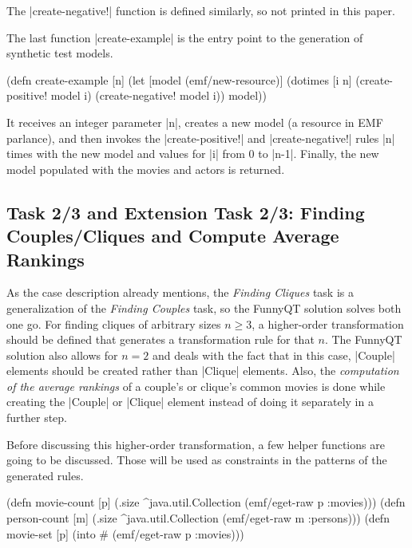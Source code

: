 \documentclass[submission]{eptcs}
\newcommand{\code}{\clojureinline}
\begin{document}
The \code|create-negative!| function is defined similarly, so not printed in
this paper.

The last function \code|create-example| is the entry point to the generation of
synthetic test models.

\begin{clojurecode}
(defn create-example [n]
  (let [model (emf/new-resource)]
    (dotimes [i n]
      (create-positive! model i)
      (create-negative! model i))
    model))
\end{clojurecode}

It receives an integer parameter \code|n|, creates a new model (a resource in
EMF parlance), and then invokes the \code|create-positive!| and
\code|create-negative!| rules \code|n| times with the new model and values for
\code|i| from 0 to \code|n-1|.  Finally, the new model populated with the
movies and actors is returned.


\subsection{Task 2/3 and Extension Task 2/3: Finding Couples/Cliques and
  Compute Average Rankings}
\label{sec:task-2:finding-groups}

As the case description already mentions, the \emph{Finding Cliques} task is a
generalization of the \emph{Finding Couples} task, so the FunnyQT solution
solves both one go.  For finding cliques of arbitrary sizes \(n \geq 3\),
a higher-order transformation should be defined that generates a transformation
rule for that \(n\).
The FunnyQT solution also allows for \(n = 2\)
and deals with the fact that in this case, \code|Couple| elements should be
created rather than \code|Clique| elements.  Also, the \emph{computation of the
  average rankings} of a couple's or clique's common movies is done while
creating the \code|Couple| or \code|Clique| element instead of doing it
separately in a further step.

Before discussing this higher-order transformation, a few helper functions are
going to be discussed.  Those will be used as constraints in the patterns of
the generated rules.

\begin{clojurecode}
(defn movie-count [p]
  (.size ^java.util.Collection (emf/eget-raw p :movies)))
(defn person-count [m]
  (.size ^java.util.Collection (emf/eget-raw m :persons)))
(defn movie-set [p]
  (into #{} (emf/eget-raw p :movies)))
\end{clojurecode}
\end{document}
